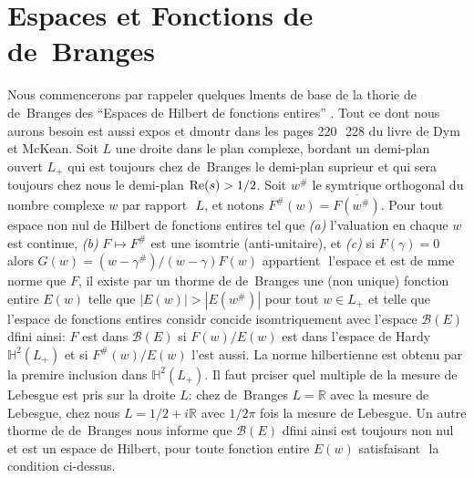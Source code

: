 \documentclass[11pt]{amsart}
\theoremstyle{definition}
\newcommand\RR{{\mathbb R}}
\newcommand\HH{{\mathbb H}}
\newcommand\cB{{\mathcal B}}
\renewcommand{\Re}{{\rm Re}}
\begin{document}
\section{Espaces et Fonctions de de~Branges}

Nous commencerons par rappeler quelques lments de base de la thorie
de de~Branges des ``Espaces de Hilbert de fonctions entires''
\cite{bra}. Tout ce dont nous aurons besoin est aussi expos et dmontr dans les
pages 220  228 du livre \cite{dymkean2} de Dym et McKean. Soit $L$
une droite dans le plan complexe, bordant un demi-plan ouvert $L_+$
qui est toujours chez de~Branges le demi-plan suprieur et qui sera
toujours chez nous le demi-plan $\Re(s) > 1/2$. Soit $w^\#$ le
symtrique orthogonal du nombre complexe $w$ par rapport  $L$, et
notons $F^\#(w) = \overline{F(w^\#)}$. Pour tout espace non nul de
Hilbert de fonctions entires tel que \textit{(a)} l'valuation en
chaque $w$ est continue, \textit{(b)} $F\mapsto F^\#$ est une
isomtrie (anti-unitaire), et \textit{(c)} si $F(\gamma) = 0$ alors
$G(w) = (w-\gamma^\#)/(w-\gamma) F(w)$ appartient  l'espace et est de
mme norme que $F$, il existe par un thorme de de~Branges une (non
unique) fonction entire $E(w)$  telle que $|E(w)| > |E(w^\#)|$ pour
tout $w\in L_+$ et telle que l'espace de fonctions entires considr
concide isomtriquement avec l'espace $\cB(E)$ dfini ainsi: $F$ est
dans $\cB(E)$ si $F(w)/E(w)$ est dans l'espace de Hardy $\HH^2(L_+)$
et si $F^\#(w)/E(w)$ l'est aussi. La norme hilbertienne est obtenu par
la premire inclusion dans $\HH^2(L_+)$. Il faut prciser quel
multiple de la mesure de Lebesgue est pris sur la droite $L$: chez
de~Branges $L = \RR$ avec la mesure de Lebesgue, chez nous $L =
1/2 + i \RR$ avec $1/2\pi$ fois la mesure de Lebesgue. Un autre
thorme de de~Branges nous informe que $\cB(E)$ dfini ainsi est
toujours non nul et est un espace de Hilbert, pour toute fonction
entire $E(w)$ satisfaisant  la condition ci-dessus. 
\let\ol = \overline
\end{document}
